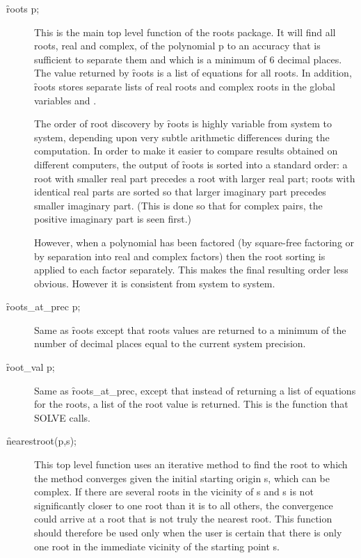 \begin{description}
\item[\f{roots} p;]
\hypertarget{operator:ROOTS}{}
\hypertarget{reserved:ROOTSREAL}{}
\hypertarget{reserved:ROOTSCOMPLEX}{}
This is the main top level function of the roots package.
It will find all roots, real and complex, of the polynomial p to an
accuracy that is sufficient to separate them and which is a minimum of 6
decimal places.  The value returned by \f{roots} is a
list of equations for all roots.  In addition, \f{roots} stores separate lists
of real roots and complex roots in the global variables  and
.  
\par
The order of root discovery by \f{roots} is highly variable from system to
system, depending upon very subtle arithmetic differences during the
computation.  In order to make it easier to compare results obtained on
different computers, the output of \f{roots} is sorted into a standard order:
a root with smaller real part precedes a root with larger real part; roots
with identical real parts are sorted so that larger imaginary part
precedes smaller imaginary part. (This is done so that for complex pairs,
the positive imaginary part is seen first.)

However, when a polynomial has been factored (by square-free factoring or
by separation into real and complex factors) then the root sorting is
applied to each factor separately.  This makes the final resulting order
less obvious.  However it is consistent from system to system.

\item[\f{roots\_at\_prec} p;]
\hypertarget{operator:ROOTS_AT_PREC}{}
Same as \f{roots} except that roots values are
returned to a minimum of the number of decimal places equal to the current
system precision.

\item[\f{root\_val} p;]
  \hypertarget{operator:ROOT_VAL}{}
Same as \f{roots\_at\_prec}, except that instead of
returning a list of equations for the roots, a list of the root value is
returned.  This is the function that SOLVE calls.

\item[\f{nearestroot}(p,s);]
  \hypertarget{operator:NEARESTROOT}{}
This top level function uses an iterative method
to find the root to which the method converges given the initial starting
origin s, which can be complex.  If there are several roots in the
vicinity of s and s is not significantly closer to one root than it is to
all others, the convergence could arrive at a root that is not truly the
nearest root.  This function should therefore be used only when the user
is certain that there is only one root in the immediate vicinity of the
starting point s.


\end{description}
